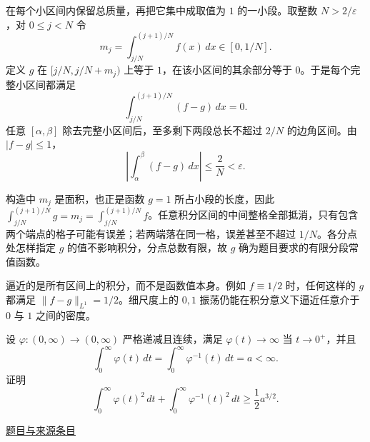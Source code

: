 \documentclass[UTF8,12pt,a4paper,fontset=fandol]{ctexart}
\begin{document}
\begin{solve}\label{ans:pre02-math:7}

在每个小区间内保留总质量，再把它集中成取值为 $1$ 的一小段。取整数 $N>2/\varepsilon$，对 $0\le j<N$ 令
\[
m_j=\int_{j/N}^{(j+1)/N}f(x)\,dx\in[0,1/N].
\]
定义 $g$ 在 $[j/N,j/N+m_j)$ 上等于 $1$，在该小区间的其余部分等于 $0$。于是每个完整小区间都满足
\[
\int_{j/N}^{(j+1)/N}(f-g)\,dx=0.
\]
任意 $[\alpha,\beta]$ 除去完整小区间后，至多剩下两段总长不超过 $2/N$ 的边角区间。由 $|f-g|\le1$，
\[
\left|\int_\alpha^\beta(f-g)\,dx\right|\le\frac2N<\varepsilon.
\]

构造中 $m_j$ 是面积，也正是函数 $g=1$ 所占小段的长度，因此 $\int_{j/N}^{(j+1)/N}g=m_j=\int_{j/N}^{(j+1)/N}f$。任意积分区间的中间整格全部抵消，只有包含两个端点的格子可能有误差；若两端落在同一格，误差甚至不超过 $1/N$。各分点处怎样指定 $g$ 的值不影响积分，分点总数有限，故 $g$ 确为题目要求的有限分段常值函数。

\end{solve}

\begin{remark}[方法与条件]逼近的是所有区间上的积分，而不是函数值本身。例如 $f\equiv1/2$ 时，任何这样的 $g$ 都满足 $\|f-g\|_{L^1}=1/2$。细尺度上的 $0,1$ 振荡仍能在积分意义下逼近任意介于 $0$ 与 $1$ 之间的密度。\end{remark}

\begin{example}[来源序号8]\label{ex:pre02-math:8}\label{pr:pre02-math:8}

设 $\varphi:(0,\infty)\to(0,\infty)$ 严格递减且连续，满足 $\varphi(t)\to\infty$ 当 $t\to0^+$，并且
\[
\int_0^\infty\varphi(t)\,dt
=\int_0^\infty\varphi^{-1}(t)\,dt=a<\infty.
\]
证明
\[
\int_0^\infty\varphi(t)^2\,dt
+\int_0^\infty\varphi^{-1}(t)^2\,dt
\ge\frac12a^{3/2}.
\]

\par\href{https://github.com/lzxcr/cmc-mathematics/blob/64916fa1fdbc3e444a652eca204d5669058ee321/src/problems/preliminary/02/08.md}{题目与来源条目}

\end{example}
\end{document}
